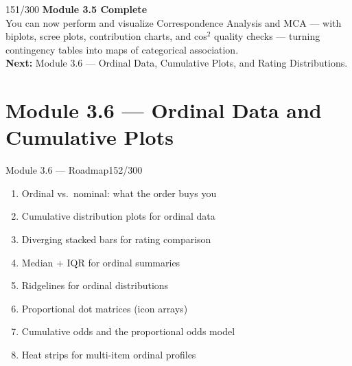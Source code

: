\documentclass[10pt]{beamer}
\newcommand{\smark}[1]{\hfill{\scriptsize\color{codegray}#1}}
\begin{document}
\begin{frame}{}\smark{151/300}
\centering\vspace{1.5cm}
{\Large\textbf{Module 3.5 Complete}}\\[0.5cm]
You can now perform and visualize Correspondence Analysis and MCA --- with biplots, scree plots, contribution charts, and cos$^2$ quality checks --- turning contingency tables into maps of categorical association.\\[0.5cm]
\textbf{Next:} Module 3.6 --- Ordinal Data, Cumulative Plots, and Rating Distributions.
\end{frame}

\section{Module 3.6 --- Ordinal Data and Cumulative Plots}

\begin{frame}{Module 3.6 --- Roadmap}\smark{152/300}
\begin{enumerate}
    \item Ordinal vs.\ nominal: what the order buys you
    \item Cumulative distribution plots for ordinal data
    \item Diverging stacked bars for rating comparison
    \item Median + IQR for ordinal summaries
    \item Ridgelines for ordinal distributions
    \item Proportional dot matrices (icon arrays)
    \item Cumulative odds and the proportional odds model
    \item Heat strips for multi-item ordinal profiles
\end{enumerate}
\end{frame}
\end{document}
